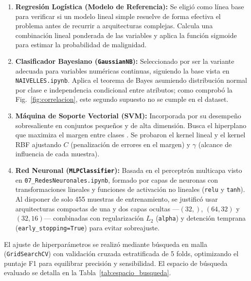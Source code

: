 \documentclass[conference]{IEEEtran}
\begin{document}
\begin{enumerate}
    \item \textbf{Regresión Logística (Modelo de Referencia):} Se eligió como línea base para verificar si un modelo lineal simple resuelve de forma efectiva el problema antes de recurrir a arquitecturas complejas. Calcula una combinación lineal ponderada de las variables y aplica la función sigmoide para estimar la probabilidad de malignidad.
    \item \textbf{Clasificador Bayesiano (\texttt{GaussianNB}):} Seleccionado por ser la variante adecuada para variables numéricas continuas, siguiendo la base vista en \texttt{NAIVELLES.ipynb}. Aplica el teorema de Bayes asumiendo distribución normal por clase e independencia condicional entre atributos; como comprobó la Fig.~\ref{fig:correlacion}, este segundo supuesto no se cumple en el dataset.
    \item \textbf{Máquina de Soporte Vectorial (SVM):} Incorporada por su desempeño sobresaliente en conjuntos pequeños y de alta dimensión. Busca el hiperplano que maximiza el margen entre clases \cite{cortes1995}. Se probaron el kernel lineal y el kernel RBF ajustando $C$ (penalización de errores en el margen) y $\gamma$ (alcance de influencia de cada muestra).
    \item \textbf{Red Neuronal (\texttt{MLPClassifier}):} Basada en el perceptrón multicapa visto en \texttt{07\_RedesNeuronales.ipynb}, formado por capas de neuronas con transformaciones lineales y funciones de activación no lineales (\texttt{relu} y \texttt{tanh}). Al disponer de solo 455 muestras de entrenamiento, se justificó usar arquitecturas compactas de una y dos capas ocultas ---$(32,)$, $(64, 32)$ y $(32, 16)$--- combinadas con regularización $L_2$ (\texttt{alpha}) y detención temprana (\texttt{early\_stopping=True}) para evitar sobreajuste.
\end{enumerate}

El ajuste de hiperparámetros se realizó mediante búsqueda en malla (\texttt{GridSearchCV}) con validación cruzada estratificada de 5 folds, optimizando el puntaje F1 para equilibrar precisión y sensibilidad. El espacio de búsqueda evaluado se detalla en la Tabla~\ref{tab:espacio_busqueda}.
\end{document}

